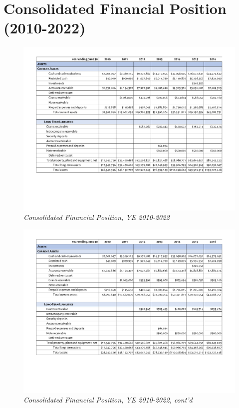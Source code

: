 
\chapter{Consolidated Financial Position (2010-2022)}\label{ch:consolidated_financial_position}

\begin{figure}
  \caption[Consolidated Financial Position, Years Ending 2010–2022]{\textit{Consolidated Financial Position, YE 2010-2022}}
  \label{fig:consolidated_financial_position_2010-2022} %
  \includegraphics[page=1,scale=0.8]{Consolidated_Financial_Position_Years_2010-2022} %
\end{figure}

\begin{figure}
  \caption*{\textit{Consolidated Financial Position, YE 2010-2022, cont'd}}
 \label{fig:consolidated_financial_position_2010-2022} %
 \includegraphics[page=2,scale=0.9]{Consolidated_Financial_Position_Years_2010-2022} %
\end{figure}

